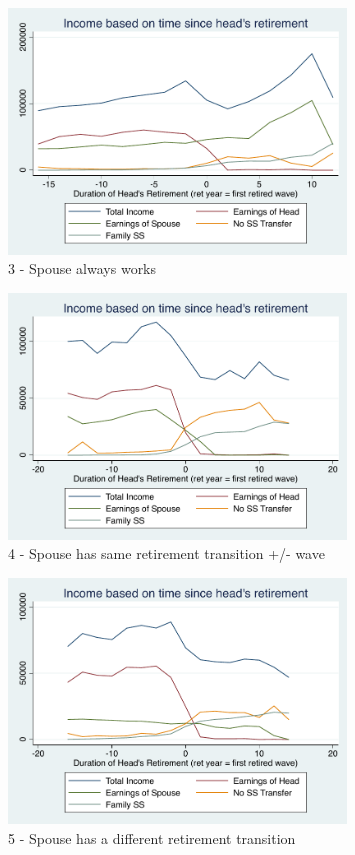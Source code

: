 \documentclass[11pt,onecolumn]{article}
\numberwithin{figure}{section}
\begin{document}
\begin{figure}[h]
	\caption{3 - Spouse always works}
	\centering
	\includegraphics[width=0.8\textwidth]{../IncomeAroundRetirement/Income_with_spouse_definition_3.pdf}
\end{figure}

\begin{figure}[h]
	\caption{4 - Spouse has same retirement transition +/- wave}
	\centering
	\includegraphics[width=0.8\textwidth]{../IncomeAroundRetirement/Income_with_spouse_definition_4.pdf}
\end{figure}

\begin{figure}[h]
	\caption{5 - Spouse has a different retirement transition}
	\centering
	\includegraphics[width=0.8\textwidth]{../IncomeAroundRetirement/Income_with_spouse_definition_5.pdf}
\end{figure}
\end{document}
